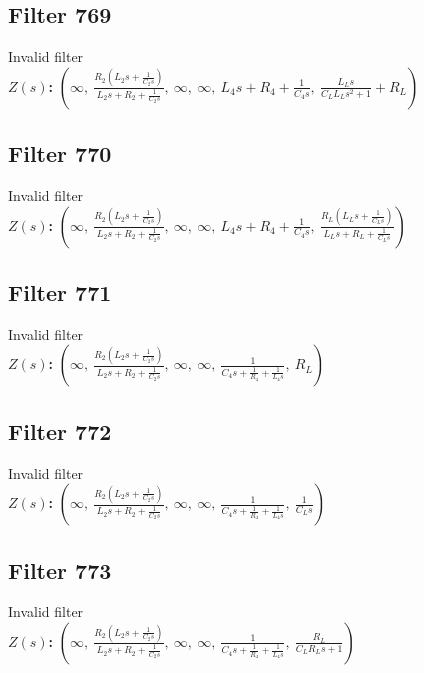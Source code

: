 \documentclass{article}
\begin{document}
\subsection*{Filter 769}
Invalid filter \\ 
\textbf{$Z(s)$:} $\left( \infty, \  \frac{R_{2} \left(L_{2} s + \frac{1}{C_{2} s}\right)}{L_{2} s + R_{2} + \frac{1}{C_{2} s}}, \  \infty, \  \infty, \  L_{4} s + R_{4} + \frac{1}{C_{4} s}, \  \frac{L_{L} s}{C_{L} L_{L} s^{2} + 1} + R_{L}\right)$ \\ 
\subsection*{Filter 770}
Invalid filter \\ 
\textbf{$Z(s)$:} $\left( \infty, \  \frac{R_{2} \left(L_{2} s + \frac{1}{C_{2} s}\right)}{L_{2} s + R_{2} + \frac{1}{C_{2} s}}, \  \infty, \  \infty, \  L_{4} s + R_{4} + \frac{1}{C_{4} s}, \  \frac{R_{L} \left(L_{L} s + \frac{1}{C_{L} s}\right)}{L_{L} s + R_{L} + \frac{1}{C_{L} s}}\right)$ \\ 
\subsection*{Filter 771}
Invalid filter \\ 
\textbf{$Z(s)$:} $\left( \infty, \  \frac{R_{2} \left(L_{2} s + \frac{1}{C_{2} s}\right)}{L_{2} s + R_{2} + \frac{1}{C_{2} s}}, \  \infty, \  \infty, \  \frac{1}{C_{4} s + \frac{1}{R_{4}} + \frac{1}{L_{4} s}}, \  R_{L}\right)$ \\ 
\subsection*{Filter 772}
Invalid filter \\ 
\textbf{$Z(s)$:} $\left( \infty, \  \frac{R_{2} \left(L_{2} s + \frac{1}{C_{2} s}\right)}{L_{2} s + R_{2} + \frac{1}{C_{2} s}}, \  \infty, \  \infty, \  \frac{1}{C_{4} s + \frac{1}{R_{4}} + \frac{1}{L_{4} s}}, \  \frac{1}{C_{L} s}\right)$ \\ 
\subsection*{Filter 773}
Invalid filter \\ 
\textbf{$Z(s)$:} $\left( \infty, \  \frac{R_{2} \left(L_{2} s + \frac{1}{C_{2} s}\right)}{L_{2} s + R_{2} + \frac{1}{C_{2} s}}, \  \infty, \  \infty, \  \frac{1}{C_{4} s + \frac{1}{R_{4}} + \frac{1}{L_{4} s}}, \  \frac{R_{L}}{C_{L} R_{L} s + 1}\right)$ \\ 
\end{document}
